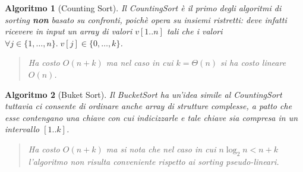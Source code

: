 \documentclass[oneside]{book}
\newtheorem{alg}{Algoritmo}
\begin{document}
\pagebreak

\begin{alg}[Counting Sort]
  Il CountingSort \`e il primo degli algoritmi di sorting \textbf{non} basato su
  confronti, poich\`e opera su insiemi ristretti: deve infatti ricevere in input
  un array di valori $v[1..n]$ tali che i valori $\forall j \in \{1,\ldots,n\}.
  \; v[j] \in \{0,\ldots,k\}$.

  \begin{algorithm}[H]
  \end{algorithm}
  \begin{quote}
    Ha costo $O(n + k)$ ma nel caso in cui $k = \Theta(n)$ si ha costo lineare $O(n)$.
  \end{quote}
\end{alg}

\begin{alg}[Buket Sort]
  Il BucketSort ha un'idea simile al CountingSort tuttavia ci consente di
  ordinare anche array di strutture complesse, a patto che esse contengano una
  chiave con cui indicizzarle e tale chiave sia compresa in un intervallo $[1..k]$.

  \begin{algorithm}[H]

  \end{algorithm}
  \begin{quote}
    Ha costo $O(n + k)$ ma si nota che nel caso in cui $n \log_2 n < n + k$ l'algoritmo
    non risulta conveniente rispetto ai sorting pseudo-lineari.
  \end{quote}
\end{alg}
\end{document}
